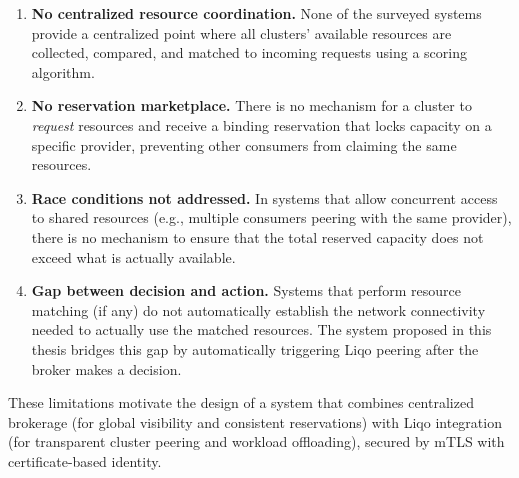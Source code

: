 \begin{enumerate}
    \item \textbf{No centralized resource coordination.} None of the surveyed systems provide a centralized point where all clusters' available resources are collected, compared, and matched to incoming requests using a scoring algorithm.

    \item \textbf{No reservation marketplace.} There is no mechanism for a cluster to \emph{request} resources and receive a binding reservation that locks capacity on a specific provider, preventing other consumers from claiming the same resources.

    \item \textbf{Race conditions not addressed.} In systems that allow concurrent access to shared resources (e.g., multiple consumers peering with the same provider), there is no mechanism to ensure that the total reserved capacity does not exceed what is actually available.

    \item \textbf{Gap between decision and action.} Systems that perform resource matching (if any) do not automatically establish the network connectivity needed to actually use the matched resources. The system proposed in this thesis bridges this gap by automatically triggering Liqo peering after the broker makes a decision.
\end{enumerate}

These limitations motivate the design of a system that combines centralized brokerage (for global visibility and consistent reservations) with Liqo integration (for transparent cluster peering and workload offloading), secured by mTLS with certificate-based identity.
